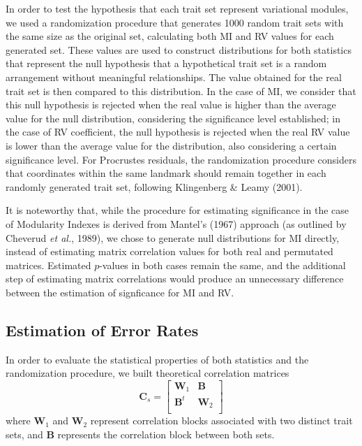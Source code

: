 \documentclass[12pt,]{article}
\begin{document}
In order to test the hypothesis that each trait set represent
variational modules, we used a randomization procedure that generates
1000 random trait sets with the same size as the original set,
calculating both MI and RV values for each generated set. These values
are used to construct distributions for both statistics that represent
the null hypothesis that a hypothetical trait set is a random
arrangement without meaningful relationships. The value obtained for the
real trait set is then compared to this distribution. In the case of MI,
we consider that this null hypothesis is rejected when the real value is
higher than the average value for the null distribution, considering the
significance level established; in the case of RV coefficient, the null
hypothesis is rejected when the real RV value is lower than the average
value for the distribution, also considering a certain significance
level. For Procrustes residuals, the randomization procedure considers
that coordinates within the same landmark should remain together in each
randomly generated trait set, following Klingenberg \& Leamy (2001).

It is noteworthy that, while the procedure for estimating significance
in the case of Modularity Indexes is derived from Mantel's (1967)
approach (as outlined by Cheverud \emph{et al.}, 1989), we chose to
generate null distributions for MI directly, instead of estimating
matrix correlation values for both real and permutated matrices.
Estimated $p$-values in both cases remain the same, and the additional
step of estimating matrix correlations would produce an unnecessary
difference between the estimation of signficance for MI and RV.

\subsection{Estimation of Error Rates}\label{estimation-of-error-rates}

In order to evaluate the statistical properties of both statistics and
the randomization procedure, we built theoretical correlation matrices
\[
\mathbf{C}_{s} =
\begin{bmatrix}
\mathbf{W}_1 & \mathbf{B} \\
\mathbf{B}^t & \mathbf{W}_2 \\
\end{bmatrix}
\] where $\mathbf{W}_1$ and $\mathbf{W}_2$ represent correlation blocks
associated with two distinct trait sets, and $\mathbf{B}$ represents the
correlation block between both sets.
\end{document}
